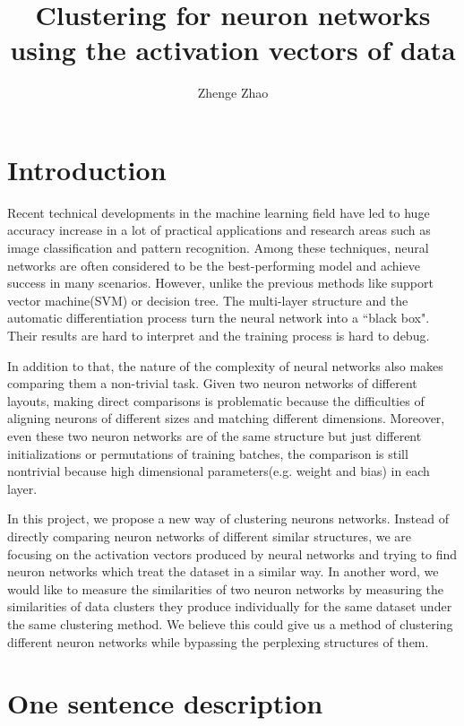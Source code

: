 \documentclass[11pt, twocolumn]{article}
\begin{document}
\title{Clustering for neuron networks\\using the activation vectors of data}

\author{Zhenge Zhao}

\maketitle

\section{Introduction}

Recent technical developments in the machine learning field have led to huge accuracy increase in a lot of practical applications and research areas such as image classification and pattern recognition. Among these techniques, neural networks are often considered to be the best-performing model and achieve success in many scenarios. However, unlike the previous methods like support vector machine(SVM) or decision tree. The multi-layer structure and the automatic differentiation process turn the neural network into a ``black box". Their results are hard to interpret and the training process is hard to debug.

In addition to that, the nature of the complexity of neural networks also makes comparing them a non-trivial task. Given two neuron networks of different layouts, making direct comparisons is problematic because the difficulties of aligning neurons of different sizes and  matching different dimensions. Moreover, even these two neuron networks are of the same structure but just different initializations or permutations of training batches, the comparison is still nontrivial because high dimensional parameters(e.g. weight and bias) in each layer.

In this project, we propose a new way of clustering neurons networks. Instead of directly comparing neuron networks of different similar structures, we are focusing on the activation vectors produced by neural networks and trying to find neuron networks which treat the dataset in a similar way. In another word, we would like to measure the similarities of two neuron networks by measuring the similarities of data clusters they
produce individually for the same dataset under the same clustering method. We believe this could give us a method of clustering different neuron networks while bypassing the perplexing structures of them.

\section{One sentence description}
\end{document}
